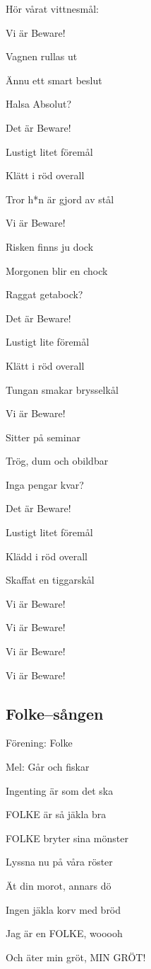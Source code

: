 Hör vårat vittnesmål:

Vi är Beware!

Vagnen rullas ut

Ännu ett smart beslut

Halsa Absolut?

Det är Beware!

Lustigt litet föremål

Klätt i röd overall

Tror h*n är gjord av stål

Vi är Beware!

Risken finns ju dock

Morgonen blir en chock

Raggat getabock?

Det är Beware!

Lustigt lite föremål

Klätt i röd overall

Tungan smakar brysselkål

Vi är Beware!

Sitter på seminar

Trög, dum och obildbar

Inga pengar kvar?

Det är Beware!

Lustigt litet föremål

Klädd i röd overall

Skaffat en tiggarskål

Vi är Beware!

Vi är Beware!

Vi är Beware!

Vi är Beware!\bigskip

\subsection{\textbf{Folke--sången}}

Förening: Folke

Mel: Går och fiskar

Ingenting är som det ska

FOLKE är så jäkla bra

FOLKE bryter sina mönster

Lyssna nu på våra röster

Ät din morot, annars dö

Ingen jäkla korv med bröd

Jag är en FOLKE, wooooh

Och äter min gröt, MIN GRÖT!

